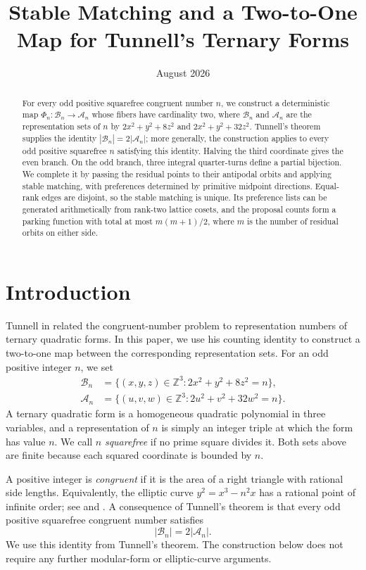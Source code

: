 \documentclass[11pt]{amsart}
\title[A two-to-one map for Tunnell's forms]
{Stable Matching and a Two-to-One Map
for Tunnell's Ternary Forms}
\date{August 2026}
\theoremstyle{definition}
\theoremstyle{remark}
\newcommand{\Z}{\mathbb Z}
\newcommand{\Bn}{\mathcal B_n}
\newcommand{\An}{\mathcal A_n}
\begin{document}
\begin{abstract}
For every odd positive squarefree congruent number $n$, we construct a
deterministic map $\Phi_n:\Bn\to\An$ whose fibers have cardinality two, where
$\Bn$ and $\An$ are the representation sets of $n$ by
$2x^2+y^2+8z^2$ and $2x^2+y^2+32z^2$.  Tunnell's theorem supplies the
identity $|\Bn|=2|\An|$; more generally, the construction applies
to every odd positive squarefree $n$ satisfying this identity.  Halving the
third coordinate gives the even branch.  On the odd branch, three integral
quarter-turns define a partial bijection.  We complete it by passing the
residual points to their antipodal orbits and applying stable matching, with
preferences determined by primitive midpoint directions.  Equal-rank edges
are disjoint, so the stable matching is unique.  Its preference lists can be
generated arithmetically from rank-two lattice cosets, and the proposal counts
form a parking function with total at most $m(m+1)/2$, where $m$ is the number
of residual orbits on either side.
\end{abstract}

\maketitle

\section{Introduction}

Tunnell in \cite{Tunnell} related the congruent-number problem to
representation numbers of ternary quadratic forms.  In this paper, we use
his counting identity to construct a two-to-one map between the corresponding
representation sets.  For an odd positive integer $n$, we set
\begin{align}
 \Bn&=\{(x,y,z)\in\Z^3:2x^2+y^2+8z^2=n\},\label{eq:B-def}\\
 \An&=\{(u,v,w)\in\Z^3:2u^2+v^2+32w^2=n\}.\label{eq:A-def}
\end{align}
A ternary quadratic form is a homogeneous quadratic polynomial in three
variables, and a representation of $n$ is simply an integer triple at which
the form has value $n$.  We call $n$ \emph{squarefree} if no prime square
divides it.  Both sets above are finite because each squared coordinate is
bounded by $n$.

A positive integer is \emph{congruent} if it is the area of a right triangle
with rational side lengths.  Equivalently, the elliptic curve
$y^2=x^3-n^2x$ has a rational point of infinite order; see
\cite[Chap.~I, \S9]{Koblitz} and \cite[pp.~323--324]{Tunnell}.  A consequence
of Tunnell's theorem is that every odd positive squarefree congruent number
satisfies
\begin{equation}\label{eq:Tunnell-balance}
 |\Bn|=2|\An|.
\end{equation}
We use this identity from Tunnell's theorem.  The construction below does not
require any further modular-form or elliptic-curve arguments.
\end{document}
